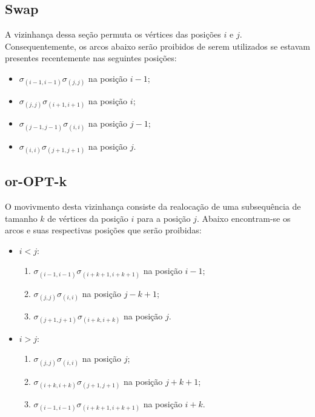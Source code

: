 \subsection{Swap}\label{sec:LABEL_CHP_5_SUBSEC_B}

\par A vizinhança dessa seção permuta os vértices das posições $i$ e $j$. Consequentemente, os arcos abaixo serão proibidos de serem utilizados se estavam presentes recentemente nas seguintes posições:

	\begin{itemize}
        \item $\sigma_{(i-1, i-1)}\sigma_{(j, j)}$ na posição $i-1$;
        \item $\sigma_{(j, j)}\sigma_{(i+1, i+1)}$ na posição $i$;                				\item $\sigma_{(j-1, j-1)}\sigma_{(i, i)}$ na posição $j-1$;
        \item $\sigma_{(i, i)}\sigma_{(j+1, j+1)}$ na posição $j$.
    \end{itemize}
    
\subsection{or-OPT-k}\label{sec:LABEL_CHP_5_SUBSEC_C}

\par O movivmento desta vizinhança consiste da realocação de uma subsequência de tamanho $k$ de vértices da posição $i$ para a posição $j$. Abaixo encontram-se os arcos e suas respectivas posições que serão proibidas:

    \begin{itemize}
        \item $i < j$:
        \begin{enumerate}
	        \item $\sigma_{(i-1, i-1)}\sigma_{(i+k+1, i+k+1)}$ na posição $i-1$;
    	    \item $\sigma_{(j, j)}\sigma_{(i, i)}$ na posição $j-k+1$;                				\item $\sigma_{(j+1, j+1)}\sigma_{(i+k, i+k)}$ na posição $j$.
        \end{enumerate}
        \item $i > j$:
        \begin{enumerate}
	        \item $\sigma_{(j, j)}\sigma_{(i, i)}$ na posição $j$;
    	    \item $\sigma_{(i+k, i+k)}\sigma_{(j+1, j+1)}$ na posição $j+k+1$;                			\item $\sigma_{(i-1, i-1)}\sigma_{(i+k+1, i+k+1)}$ na posição $i+k$.
        \end{enumerate}
    \end{itemize}    
    
